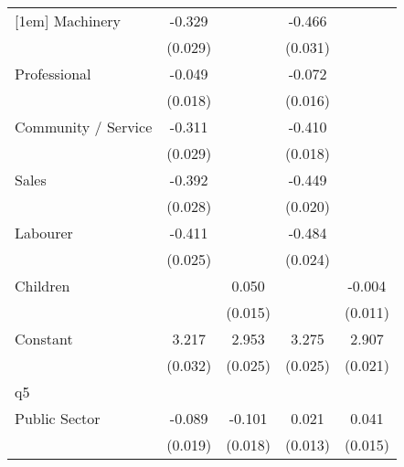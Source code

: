 {\begin{tabular}{l*{4}{c}}
[1em]
Machinery           &      -0.329\sym{***}&                     &      -0.466\sym{***}&                     \\
                    &     (0.029)         &                     &     (0.031)         &                     \\
[1em]
Professional        &      -0.049\sym{**} &                     &      -0.072\sym{***}&                     \\
                    &     (0.018)         &                     &     (0.016)         &                     \\
[1em]
Community / Service &      -0.311\sym{***}&                     &      -0.410\sym{***}&                     \\
                    &     (0.029)         &                     &     (0.018)         &                     \\
[1em]
Sales               &      -0.392\sym{***}&                     &      -0.449\sym{***}&                     \\
                    &     (0.028)         &                     &     (0.020)         &                     \\
[1em]
Labourer            &      -0.411\sym{***}&                     &      -0.484\sym{***}&                     \\
                    &     (0.025)         &                     &     (0.024)         &                     \\
[1em]
Children            &                     &       0.050\sym{***}&                     &      -0.004         \\
                    &                     &     (0.015)         &                     &     (0.011)         \\
[1em]
Constant            &       3.217\sym{***}&       2.953\sym{***}&       3.275\sym{***}&       2.907\sym{***}\\
                    &     (0.032)         &     (0.025)         &     (0.025)         &     (0.021)         \\
\hline
q5                  &                     &                     &                     &                     \\
Public Sector       &      -0.089\sym{***}&      -0.101\sym{***}&       0.021         &       0.041\sym{**} \\
                    &     (0.019)         &     (0.018)         &     (0.013)         &     (0.015)         \\

\end{tabular}}
